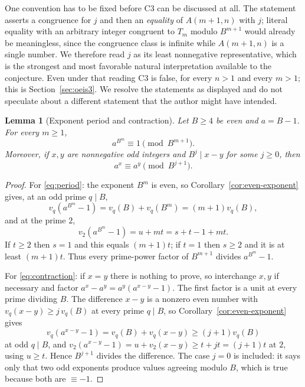 \documentclass[11pt,letterpaper]{article}
\numberwithin{equation}{section}
\newtheorem{lemma}[theorem]{Lemma}
\theoremstyle{definition}
\theoremstyle{remark}
\begin{document}
One convention has to be fixed before C3 can be discussed at all. The statement asserts a congruence for $j$ and then an \emph{equality} of $A(m+1,n)$ with $j$; literal equality with an arbitrary integer congruent to $T_m$ modulo $B^{m+1}$ would already be meaningless, since the congruence class is infinite while $A(m+1,n)$ is a single number. We therefore read $j$ as its least nonnegative representative, which is the strongest and most favorable natural interpretation available to the conjecture. Even under that reading C3 is false, for every $n>1$ and every $m>1$; this is Section~\ref{sec:oeis3}. We resolve the statements as displayed and do not speculate about a different statement that the author might have intended.

\begin{lemma}[Exponent period and contraction]\label{lem:period}
Let $B\ge4$ be even and $a=B-1$. For every $m\ge1$,
\begin{equation}\label{eq:period}
 a^{B^m}\equiv1\pmod{B^{m+1}}.
\end{equation}
Moreover, if $x,y$ are nonnegative \emph{odd} integers and $B^j\mid x-y$ for some $j\ge0$, then
\begin{equation}\label{eq:contraction}
 a^x\equiv a^y\pmod{B^{j+1}}.
\end{equation}
\end{lemma}
\begin{proof}
For \eqref{eq:period}: the exponent $B^m$ is even, so Corollary~\ref{cor:even-exponent} gives, at an odd prime $q\mid B$,
\[
 v_q(a^{B^m}-1)=v_q(B)+v_q(B^m)=(m+1)v_q(B),
\]
and at the prime $2$,
\[
 v_2(a^{B^m}-1)=u+mt=s+t-1+mt.
\]
If $t\ge2$ then $s=1$ and this equals $(m+1)t$; if $t=1$ then $s\ge2$ and it is at least $(m+1)t$. Thus every prime-power factor of $B^{m+1}$ divides $a^{B^m}-1$.

For \eqref{eq:contraction}: if $x=y$ there is nothing to prove, so interchange $x,y$ if necessary and factor $a^x-a^y=a^y(a^{x-y}-1)$. The first factor is a unit at every prime dividing $B$. The difference $x-y$ is a nonzero even number with $v_q(x-y)\ge j\,v_q(B)$ at every prime $q\mid B$, so Corollary~\ref{cor:even-exponent} gives
\[
 v_q(a^{x-y}-1)=v_q(B)+v_q(x-y)\ge(j+1)v_q(B)
\]
at odd $q\mid B$, and $v_2(a^{x-y}-1)=u+v_2(x-y)\ge t+jt=(j+1)t$ at $2$, using $u\ge t$. Hence $B^{j+1}$ divides the difference. The case $j=0$ is included: it says only that two odd exponents produce values agreeing modulo $B$, which is true because both are $\equiv-1$.
\end{proof}
\end{document}

